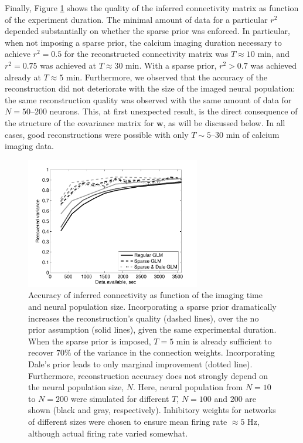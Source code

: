 \documentclass[aoas,preprint]{imsart}
\newcommand{\w}{w}
\newcommand{\bw}{\mathbf{\w}}
\begin{document}
Finally, Figure \ref{fig:recvar-NT} shows the quality of the inferred connectivity matrix as function of the experiment duration. The minimal amount of data for a particular $r^2$ depended substantially on whether the sparse prior was enforced. In particular, when not imposing a sparse prior, the calcium imaging duration necessary to achieve $r^2=0.5$ for the reconstructed connectivity matrix was $T\approx 10$ min, and $r^2=0.75$ was achieved at $T\approx 30$ min. With a sparse prior, $r^2>0.7$ was achieved already at $T\approx 5$ min. Furthermore, we observed that the accuracy of the reconstruction did not deteriorate with the size of the imaged neural population: the same reconstruction quality was observed with the same amount of data for $N=50$--$200$ neurons.  This, at first unexpected result, is the direct consequence of the structure of the covariance matrix for $\bw$, as will be discussed below. In all cases, good reconstructions were possible with only $T\sim 5$--$30$ min of calcium imaging data.

\begin{figure}[h]
\centering
\includegraphics[width=3in]{../figs/FigureA7_recvar_NT}
\caption{Accuracy of inferred connectivity as function of the imaging time and neural population size. Incorporating a sparse prior dramatically increases the reconstruction's quality (dashed lines), over the no prior assumption (solid lines), given the same experimental duration. When the sparse prior is imposed, $T=5$ min is already sufficient to recover $70\%$ of the variance in the connection weights. Incorporating Dale's prior leads to only marginal improvement (dotted line). Furthermore, reconstruction accuracy does not strongly depend on the neural population size, $N$. Here, neural population from $N=10$ to $N=200$ were simulated for different $T$, $N=100$ and $200$ are shown (black and gray, respectively).  Inhibitory weights for networks of different sizes were chosen to ensure mean firing rate $\approx 5$ Hz, although actual firing rate varied somewhat.}
\label{fig:recvar-NT}
\end{figure}
\end{document}
